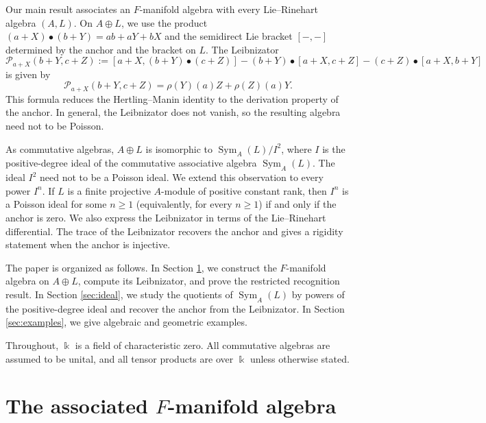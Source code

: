 \documentclass[12pt,reqno]{amsart}
\theoremstyle{definition}
\theoremstyle{remark}
\newcommand{\kk}{\Bbbk}
\newcommand{\Sym}{\operatorname{Sym}}
\newcommand{\Pcal}{\mathcal P}
\begin{document}
	Our main result associates an $F$-manifold algebra with every Lie--Rinehart
	algebra $(A,L)$.  On $A\oplus L$, we use the product
	$(a+X)\bullet(b+Y)=ab+aY+bX$ and the semidirect Lie bracket $[-,-]$ determined by the
	anchor and the bracket on $L$.  The Leibnizator
$$
\Pcal_{a+X}(b+Y,c+Z):=[a+X,(b+Y)\bullet(c+Z)]-(b+Y)\bullet[a+X,c+Z]-(c+Z)\bullet[a+X,b+Y]
$$
is given by
	\[
	\Pcal_{a+X}(b+Y,c+Z)=\rho(Y)(a)Z+\rho(Z)(a)Y.
	\]
	This formula reduces the Hertling--Manin identity to the derivation property
	of the anchor.  In general, the Leibnizator does not vanish, so the resulting
	algebra need not to be Poisson.
	
	As commutative algebras, $A\oplus L$ is isomorphic to
	$\Sym_A(L)/I^2$, where $I$ is the positive-degree ideal of the commutative associative
	algebra $\Sym_A(L)$.  The ideal $I^2$ need not to be a Poisson ideal.  We extend
	this observation to every power $I^n$.  If $L$ is a finite projective
	$A$-module of positive constant rank, then $I^n$ is a Poisson ideal for some
	$n\geq1$ (equivalently, for every $n\geq1$) if and only if the anchor is zero.
	We also express the
	Leibnizator in terms of the Lie--Rinehart differential.  The trace of the
	Leibnizator recovers the anchor and gives a rigidity statement when the
	anchor is injective.
	
%	
	
	
	The paper is organized as follows.  In Section \ref{sec:construction}, we
	construct the $F$-manifold algebra on $A\oplus L$, compute its Leibnizator,
	and prove the restricted recognition result.  In Section
	\ref{sec:ideal}, we study the quotients of $\Sym_A(L)$ by powers of the
	positive-degree ideal and recover the anchor from the Leibnizator.  In
	Section \ref{sec:examples}, we give algebraic and geometric examples.
	
	Throughout, $\kk$ is a field of characteristic zero.  All commutative algebras
	are assumed to be unital, and all tensor products are over $\kk$ unless
	otherwise stated.
	
	\section{The associated \texorpdfstring{$F$}{F}-manifold algebra}
	\label{sec:construction}
	
\end{document}
